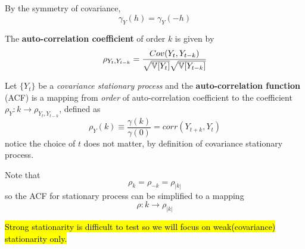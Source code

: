 \documentclass[11pt]{article}
\begin{document}
		\begin{proposition}
			By the symmetry of covariance, 
			\begin{equation}
				\gamma_Y(h) = \gamma_Y(-h)
			\end{equation}
		\end{proposition}
		
		\begin{definition}
			The \textbf{auto-correlation coefficient} of order $k$ is given by
			\begin{equation}
				\rho_{Y_t, Y_{t-k}} = \frac{Cov(Y_t, Y_{t-k})}{\sqrt{\mathbb{V}[{Y_t}]}\sqrt{\mathbb{V}[{Y_{t-k}}]}}
			\end{equation}
		\end{definition}
		
		\begin{definition}
			Let $\{Y_t\}$ be a \emph{covariance stationary process} and the \textbf{auto-correlation function} (ACF) is a mapping from \emph{order} of auto-correlation coefficient to the coefficient $\rho_Y: k \to \rho_{Y_t, Y_{t-k}}$, defined as
			\begin{equation}
				\rho_Y(k) \equiv \frac{\gamma(k)}{\gamma(0)} = corr(Y_{t + k}, Y_t)
			\end{equation}
			notice the choice of $t$ does not matter, by definition of covariance stationary process.
		\end{definition}
		
		\begin{proposition}
			Note that 
			\begin{equation}
				\rho_k = \rho_{-k} = \rho_{|k|}
			\end{equation}
			so the ACF for stationary process can be simplified to a mapping 
			\begin{equation}
				\rho: k \to \rho_{|k|}
			\end{equation}
		\end{proposition}
		
		\begin{remark}
			\hl{Strong stationarity is difficult to test so we will focus on weak(covariance) stationarity only.}
		\end{remark}
		
\end{document}

